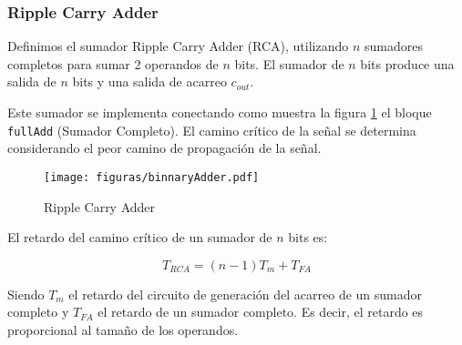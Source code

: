 \vspace{0.5cm}


\subsubsection{Ripple Carry Adder}

Definimos el sumador Ripple Carry Adder (RCA), utilizando \(n\) sumadores completos para sumar 2 operandos de \(n\) bits. El sumador de \(n\) bits produce una salida de \(n\) bits y una salida de acarreo \(c_{out}\).

Este sumador se implementa conectando como muestra la figura \ref{fig:RCA} el bloque \verb.fullAdd. (Sumador Completo). El camino crítico de la señal se determina considerando el peor camino de propagación de la señal.  

\begin{figure}[h]
  \centering
\texttt{[image: figuras/binnaryAdder.pdf]}
  \caption{Ripple Carry Adder}
  \label{fig:RCA}
\end{figure}

El retardo del camino crítico de un sumador de $n$ bits es:

\begin{equation}
T_{RCA} = (n-1)T_m+ T_{FA}
\end{equation}

Siendo $T_m$ el retardo del circuito de generación del acarreo de un sumador completo y $T_{FA}$ el retardo de un sumador completo. Es decir, el retardo es proporcional al tamaño de los operandos.

 
